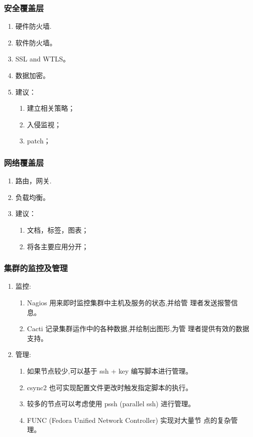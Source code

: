 \subsubsection{安全覆盖层}
\begin{enumerate}
   \item 硬件防火墙.
   \item 软件防火墙。
   \item SSL and WTLS。   
   \item 数据加密。   
   \item 建议：
       \begin{enumerate}[label=(\arabic*)]      
       \item 建立相关策略；
       \item 入侵监视；
       \item patch；
     \end{enumerate}
\end{enumerate}

\subsubsection{网络覆盖层}
\begin{enumerate}
   \item 路由，网关.
   \item 负载均衡。
   \item 建议：
       \begin{enumerate}[label=(\arabic*)]      
       \item 文档，标签，图表；
       \item 将各主要应用分开；
     \end{enumerate}
\end{enumerate}

\subsubsection{集群的监控及管理}
\begin{enumerate}[label=(\alph*)]
   \item 监控:
    \begin{enumerate}[label=(\arabic*)]
      \item Nagios 用来即时监控集群中主机及服务的状态,并给管 理者发送报警信息。
      \item Cacti 记录集群运作中的各种数据,并绘制出图形,为管 理者提供有效的数据支持。
    \end{enumerate}
   \item 管理:
    \begin{enumerate}[label=(\arabic*)]
     \item 如果节点较少,可以基于 ssh + key 编写脚本进行管理。
     \item csync2 也可实现配置文件更改时触发指定脚本的执行。
     \item 较多的节点可以考虑使用 pssh (parallel ssh) 进行管理。
     \item FUNC (Fedora Unified Network Controller) 实现对大量节 点的复杂管理。
    \end{enumerate}
\end{enumerate}

